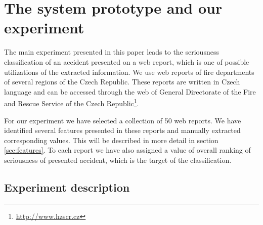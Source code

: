 \documentclass[authoryear,12pt]{elsarticle}
\begin{document}
\section{The system prototype and our experiment}
The main experiment presented in this paper leads to the seriousness classification of an accident presented on a web report, %
which is one of possible utilizations of the extracted information. We use web reports of fire departments of several regions of the Czech Republic. These reports are written in Czech language and can be accessed through the web of General Directorate of the Fire and Rescue Service of the Czech Republic\footnote{\url{http://www.hzscr.cz}}. 

For our experiment we have selected a collection of 50 web reports. We have identified several features presented in these reports and manually extracted corresponding values. This will be described in more detail in section \ref{sec:features}. To each report we have also assigned a value of overall ranking of seriousness of presented accident, which is the target of the classification.




\subsection{Experiment description} \label{sec:experiment_desc}
\end{document}
